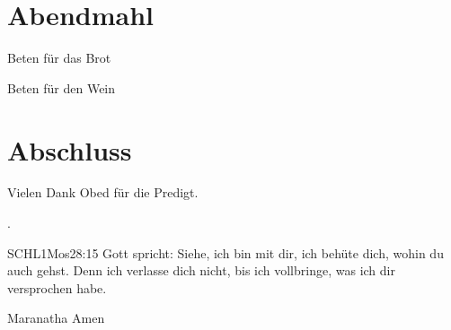 \documentclass{mybib}
\begin{document}
 \section{Abendmahl}
 
 Beten für das Brot 


 Beten für den Wein


\section{Abschluss}
Vielen Dank Obed für die Predigt.

.

\beten{}

\begin{bibelbox}{SCHL}{1Mos}{28:15}
    Gott spricht: Siehe, ich bin mit dir,
    ich behüte dich, wohin du auch gehst.
    Denn ich verlasse dich nicht,
    bis ich vollbringe, was ich dir versprochen habe.
\end{bibelbox}

Maranatha Amen
\end{document}
